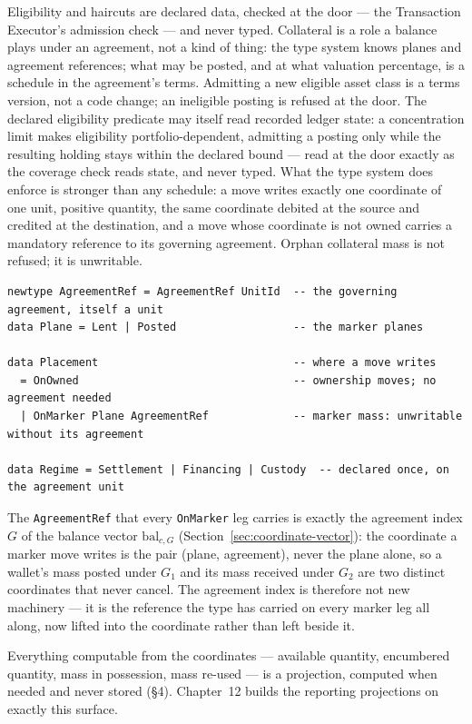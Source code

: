 \documentclass[11pt,a4paper]{article}
\begin{document}
Eligibility and haircuts are declared data, checked at the door --- the
Transaction Executor's admission check --- and never typed. Collateral is a
role a balance plays under an agreement, not a kind of thing: the type system
knows planes and agreement references; what may be posted, and at what
valuation percentage, is a schedule in the agreement's terms. Admitting a new
eligible asset class is a terms version, not a code change; an ineligible
posting is refused at the door. The declared eligibility predicate may itself read
recorded ledger state: a concentration limit makes eligibility portfolio-dependent,
admitting a posting only while the resulting holding stays within the declared bound
--- read at the door exactly as the coverage check reads state, and never typed. What
the type system does enforce is stronger
than any schedule: a move writes exactly one coordinate of one unit, positive
quantity, the same coordinate debited at the source and credited at the
destination, and a move whose coordinate is not owned carries a mandatory
reference to its governing agreement. Orphan collateral mass is not refused;
it is unwritable.

\begin{lstlisting}
newtype AgreementRef = AgreementRef UnitId  -- the governing agreement, itself a unit
data Plane = Lent | Posted                  -- the marker planes

data Placement                              -- where a move writes
  = OnOwned                                 -- ownership moves; no agreement needed
  | OnMarker Plane AgreementRef             -- marker mass: unwritable without its agreement

data Regime = Settlement | Financing | Custody  -- declared once, on the agreement unit
\end{lstlisting}

The \texttt{AgreementRef} that every \texttt{OnMarker} leg carries is exactly the
agreement index $G$ of the balance vector $\mathrm{bal}_{c,G}$
(Section~\ref{sec:coordinate-vector}): the coordinate a marker move writes is the
pair (plane, agreement), never the plane alone, so a wallet's mass posted under $G_1$ and
its mass received under $G_2$ are two distinct coordinates that never cancel. The agreement
index is therefore not new machinery --- it is the reference the type has carried on every
marker leg all along, now lifted into the coordinate rather than left beside it.

Everything computable from the coordinates --- available quantity, encumbered
quantity, mass in possession, mass re-used --- is a projection, computed when
needed and never stored (\S4). Chapter~12 builds the reporting projections on
exactly this surface.
\end{document}
